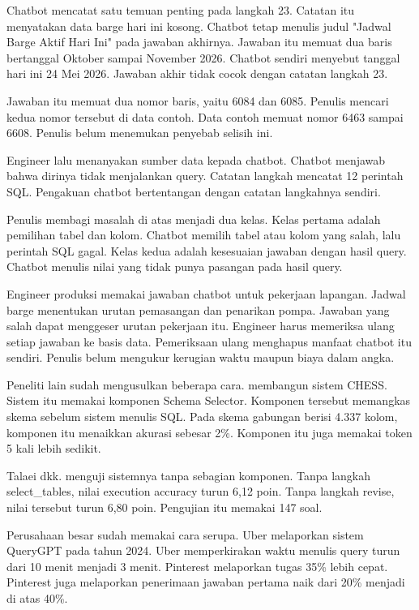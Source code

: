 Chatbot mencatat satu temuan penting pada langkah 23. Catatan itu menyatakan data barge hari ini kosong. Chatbot tetap menulis judul "Jadwal Barge Aktif Hari Ini" pada jawaban akhirnya. Jawaban itu memuat dua baris bertanggal Oktober sampai November 2026. Chatbot sendiri menyebut tanggal hari ini 24 Mei 2026. Jawaban akhir tidak cocok dengan catatan langkah 23.

Jawaban itu memuat dua nomor baris, yaitu 6084 dan 6085. Penulis mencari kedua nomor tersebut di data contoh. Data contoh memuat nomor 6463 sampai 6608. Penulis belum menemukan penyebab selisih ini.

Engineer lalu menanyakan sumber data kepada chatbot. Chatbot menjawab bahwa dirinya tidak menjalankan query. Catatan langkah mencatat 12 perintah SQL. Pengakuan chatbot bertentangan dengan catatan langkahnya sendiri.

Penulis membagi masalah di atas menjadi dua kelas. Kelas pertama adalah pemilihan tabel dan kolom. Chatbot memilih tabel atau kolom yang salah, lalu perintah SQL gagal. Kelas kedua adalah kesesuaian jawaban dengan hasil query. Chatbot menulis nilai yang tidak punya pasangan pada hasil query.

Engineer produksi memakai jawaban chatbot untuk pekerjaan lapangan. Jadwal barge menentukan urutan pemasangan dan penarikan pompa. Jawaban yang salah dapat menggeser urutan pekerjaan itu. Engineer harus memeriksa ulang setiap jawaban ke basis data. Pemeriksaan ulang menghapus manfaat chatbot itu sendiri. Penulis belum mengukur kerugian waktu maupun biaya dalam angka.

Peneliti lain sudah mengusulkan beberapa cara. \textcite{talaei2024chesscontextualharnessingefficient} membangun sistem CHESS. Sistem itu memakai komponen Schema Selector. Komponen tersebut memangkas skema sebelum sistem menulis SQL. Pada skema gabungan berisi 4.337 kolom, komponen itu menaikkan akurasi sebesar 2\%. Komponen itu juga memakai token 5 kali lebih sedikit.

Talaei dkk. menguji sistemnya tanpa sebagian komponen. Tanpa langkah select\_tables, nilai execution accuracy turun 6,12 poin. Tanpa langkah revise, nilai tersebut turun 6,80 poin. Pengujian itu memakai 147 soal.

Perusahaan besar sudah memakai cara serupa. Uber melaporkan sistem QueryGPT pada tahun 2024. Uber memperkirakan waktu menulis query turun dari 10 menit menjadi 3 menit. Pinterest melaporkan tugas 35\% lebih cepat. Pinterest juga melaporkan penerimaan jawaban pertama naik dari 20\% menjadi di atas 40\%.

